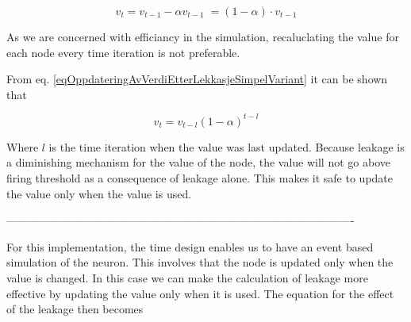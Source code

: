 	\begin{equation}
		v_t = v_{t-1} - \alpha v_{t-1} \; = (1-\alpha) \cdot v_{t-1}
		\label{eqOppdateringAvVerdiEtterLekkasjeSimpelVariant}
	\end{equation}

	As we are concerned with efficiancy in the simulation, recaluclating the value for each node every time iteration is not preferable.
	
	From eq. \eqref{eqOppdateringAvVerdiEtterLekkasjeSimpelVariant} it can be shown that 

	\begin{equation}
		v_t = v_{t-l} (1-\alpha)^{t-l}
		\label{eqLeakageForSANN}
	\end{equation}
	
	Where $l$ is the time iteration when the value was last updated.
	Because leakage is a diminishing mechanism for the value of the node, the value will not go above firing threshold as a consequence of leakage alone.
	This makes it safe to update the value only when the value is used.

----------------------------------------------------------------------------------------------\newpage





	For this implementation, the time design enables us to have an event based simulation of the neuron.
	This involves that the node is updated only when the value is changed.
	In this case we can make the calculation of leakage more effective by updating the value only when it is used.
	The equation for the effect of the leakage then becomes
%	


